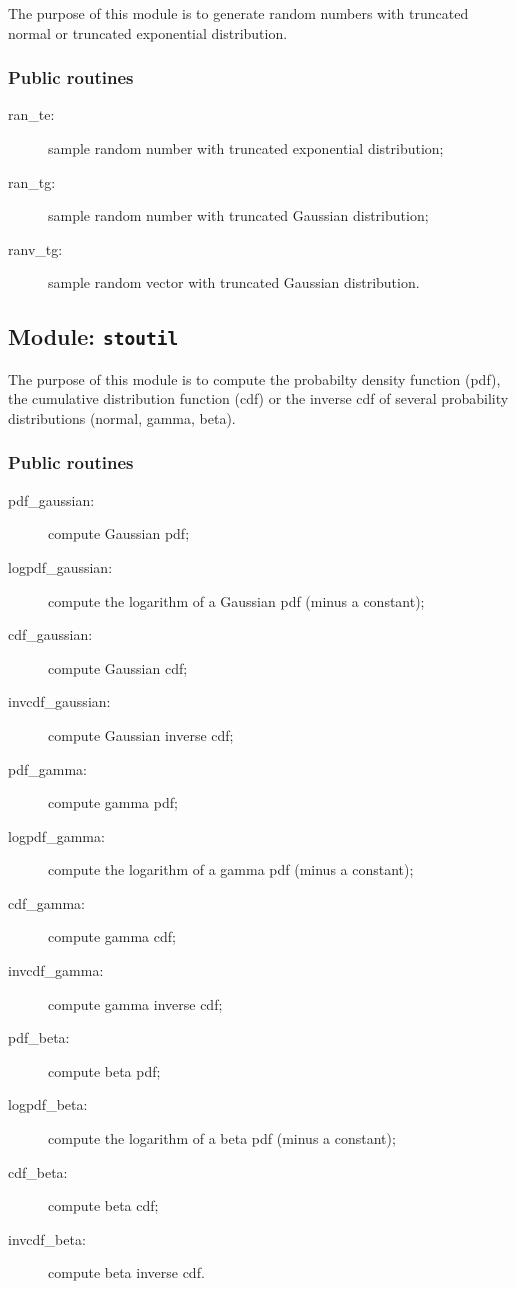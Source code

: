 \documentclass[11pt]{article}
\begin{document}
The purpose of this module is to generate random numbers
with truncated normal or truncated exponential distribution.

\subsubsection*{Public routines}

\begin{description}
\item[ran\_te:] sample random number with truncated exponential distribution;
\item[ran\_tg:] sample random number with truncated Gaussian distribution;
\item[ranv\_tg:] sample random vector with truncated Gaussian distribution.
\end{description}

\subsection{Module: {\tt\bf stoutil}}

The purpose of this module is to compute the probabilty density function (pdf),
the cumulative distribution function (cdf) or the inverse cdf
of several probability distributions (normal, gamma, beta).

\subsubsection*{Public routines}

\begin{description}
\item[pdf\_gaussian:] compute Gaussian pdf;
\item[logpdf\_gaussian:] compute the logarithm of a Gaussian pdf (minus a constant);
\item[cdf\_gaussian:] compute Gaussian cdf;
\item[invcdf\_gaussian:] compute Gaussian inverse cdf;
\item[pdf\_gamma:] compute gamma pdf;
\item[logpdf\_gamma:] compute the logarithm of a gamma pdf (minus a constant);
\item[cdf\_gamma:] compute gamma cdf;
\item[invcdf\_gamma:] compute gamma inverse cdf;
\item[pdf\_beta:] compute beta pdf;
\item[logpdf\_beta:] compute the logarithm of a beta pdf (minus a constant);
\item[cdf\_beta:] compute beta cdf;
\item[invcdf\_beta:] compute beta inverse cdf.
\end{description}
\end{document}
